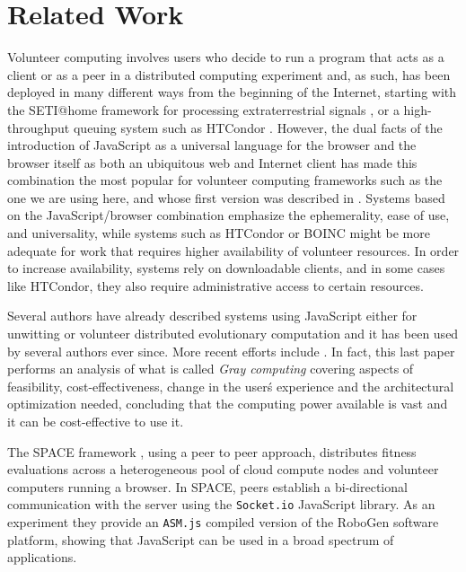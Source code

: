 \documentclass{llncs}
\begin{document}
\section{Related Work}
\label{sec:soa}

Volunteer computing involves users who decide to run a program that acts
as a client or as a peer in a distributed computing experiment
and, as such, has been deployed in many different ways from the
beginning of the Internet, starting with the SETI@home framework for
processing extraterrestrial signals \cite{david-seti:home}, or a
high-throughput queuing system such as HTCondor \cite{HTCondor}.
However,
the dual facts of the introduction of JavaScript as a universal language for the
browser and the browser itself as both an ubiquitous web and Internet client has
made this combination the most popular for volunteer computing
frameworks such as the one we are using here, and whose first version
was described in \cite{DBLP:conf/gecco/GuervosG15}. Systems based on the
JavaScript/browser combination
emphasize the ephemerality, ease of use, and universality, while
systems such as HTCondor or BOINC might be more adequate for work that %
requires higher availability of volunteer resources. In order to increase availability, systems rely on downloadable clients, and in some cases like HTCondor, they also require administrative access to certain resources.

Several authors have already described systems using JavaScript either
for unwitting
\cite{unwitting-ec,boldrin2007distributed,apolonia2012enhancing} or volunteer
\cite{langdon:2005:metas,gecco07:workshop:dcor} distributed
evolutionary computation and it has been used by several
authors ever since. More recent efforts include
\cite{duda2013distributed,DBLP:journals/corr/abs-0801-1210,EvoStar2014:jsEO,martinez2015capataz,pan2015gray}. In fact, this last paper \cite{pan2015gray} performs an analysis of what is called {\em Gray computing} covering aspects of
feasibility, cost-effectiveness, change in the user\'s experience and the
architectural optimization needed, concluding that the computing power
available is vast and it can be cost-effective to use it.

The SPACE framework \cite{leclerc2016seamless}, using a peer to peer approach, distributes fitness evaluations across a heterogeneous pool of cloud compute nodes and volunteer computers running a browser. In SPACE, peers establish a bi-directional communication with the server using the \texttt{Socket.io} JavaScript library.
As an experiment they provide an \texttt{ASM.js} compiled version of the RoboGen software platform, showing that JavaScript can be used in a broad
spectrum of applications.
\end{document}
